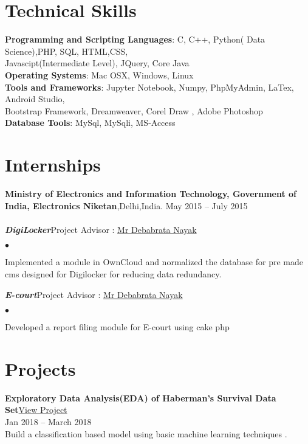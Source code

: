 \documentclass[margin,line]{res}
\newenvironment{list2}{
  \begin{list}{$\bullet$}{%
      \setlength{\itemsep}{0in}
      \setlength{\parsep}{0in} \setlength{\parskip}{0in}
      \setlength{\topsep}{0in} \setlength{\partopsep}{0in}
      \setlength{\leftmargin}{0.2in}}}{\end{list}}
\begin{document}
\begin{resume}
\section{\sc Technical Skills}
{\bf Programming and Scripting Languages}:  C, C++, Python( Data Science),PHP, SQL, HTML,CSS,\\Javascipt(Intermediate Level), JQuery,  Core Java\\
{\bf Operating Systems}: Mac OSX, Windows, Linux\\
{\bf Tools and Frameworks}: Jupyter Notebook, Numpy, PhpMyAdmin, LaTex, Android Studio,\\  Bootstrap Framework, Dreamweaver, Corel Draw , Adobe Photoshop\\
{\bf Database Tools}:  MySql, MySqli, MS-Access 
\section{\sc Internships}
{\bf 
 Ministry of Electronics and Information Technology, Government of India, Electronics Niketan},Delhi,India. \hfill{May 2015 -- July 2015}\\\\
{\em \bf DigiLocker}\hfill {Project Advisor : \href {https://www.linkedin.com/in/debabrata-nayak-a911397b/}{ Mr Debabrata Nayak}}
\begin{list2} %
\item  Implemented a module in OwnCloud  and normalized the database for pre made cms designed for Digilocker for reducing data  redundancy.\\
\end{list2}
{\em \bf E-court}\hfill {Project Advisor : \href {https://www.linkedin.com/in/debabrata-nayak-a911397b/}{ Mr Debabrata Nayak}}
\begin{list2} %
\item Developed a report filing module for E-court using cake php \\
\end{list2}

\section{\sc Projects}
{\bf Exploratory Data Analysis(EDA) of  Haberman's Survival Data Set}\hfill \href{https://www.kaggle.com/saguneshgrover/habermans-survival-data-set-eda/notebook}{View Project}\\{Jan 2018 -- March 2018}\\
Build a classification based model using basic machine learning techniques .\\\\


\end{resume}
\end{document}
